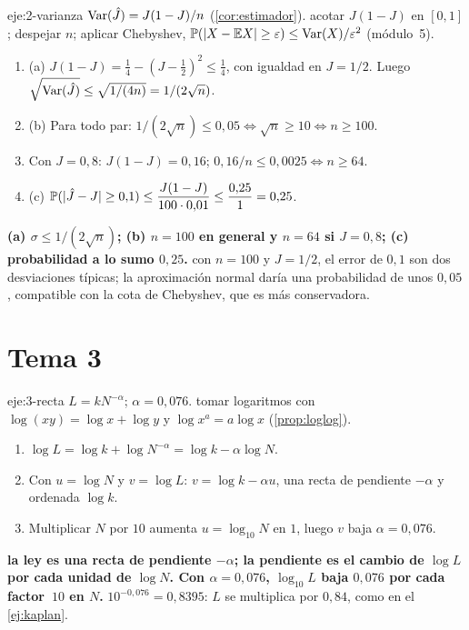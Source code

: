 \begin{solucion}{eje:2-varianza}
\datos $\operatorname{Var}(\hat J)=J(1-J)/n$ (\cref{cor:estimador}).
\planteamiento acotar $J(1-J)$ en $[0,1]$; despejar $n$; aplicar Chebyshev, $\mathbb{P}(\lvert X-\mathbb{E} X\rvert\ge\varepsilon)\le\operatorname{Var}(X)/\varepsilon^{2}$ (módulo~5).
\pasos
\begin{enumerate}[label=\arabic*.]
  \item (a) $J(1-J)=\tfrac14-(J-\tfrac12)^{2}\le\tfrac14$, con igualdad en $J=1/2$. Luego $\sqrt{\operatorname{Var}(\hat J)}\le\sqrt{1/(4n)}=1/(2\sqrt n)$.
  \item (b) Para todo par: $1/(2\sqrt n)\le 0{,}05\iff\sqrt n\ge 10\iff n\ge 100$.
  \item Con $J=0{,}8$: $J(1-J)=0{,}16$; $0{,}16/n\le 0{,}0025\iff n\ge 64$.
  \item (c) $\mathbb{P}(\lvert\hat J-J\rvert\ge 0{,}1)\le\dfrac{J(1-J)}{100\cdot 0{,}01}\le\dfrac{0{,}25}{1}=0{,}25$.
\end{enumerate}
\resultado \textbf{(a) $\sigma\le 1/(2\sqrt n)$; (b) $n=100$ en general y $n=64$ si $J=0{,}8$; (c) probabilidad a lo sumo $0{,}25$.}
\comprobacion con $n=100$ y $J=1/2$, el error de $0{,}1$ son dos desviaciones típicas; la aproximación normal daría una probabilidad de unos $0{,}05$, compatible con la cota de Chebyshev, que es más conservadora.
\end{solucion}

\section{Tema 3}

\begin{solucion}{eje:3-recta}
\datos $L=kN^{-\alpha}$; $\alpha=0{,}076$.
\planteamiento tomar logaritmos con $\log(xy)=\log x+\log y$ y $\log x^{a}=a\log x$ (\cref{prop:loglog}).
\pasos
\begin{enumerate}[label=\arabic*.]
  \item $\log L=\log k+\log N^{-\alpha}=\log k-\alpha\log N$.
  \item Con $u=\log N$ y $v=\log L$: $v=\log k-\alpha u$, una recta de pendiente $-\alpha$ y ordenada $\log k$.
  \item Multiplicar $N$ por $10$ aumenta $u=\log_{10}N$ en $1$, luego $v$ baja $\alpha=0{,}076$.
\end{enumerate}
\resultado \textbf{la ley es una recta de pendiente $-\alpha$; la pendiente es el cambio de $\log L$ por cada unidad de $\log N$. Con $\alpha=0{,}076$, $\log_{10}L$ baja $0{,}076$ por cada factor~$10$ en $N$.}
\comprobacion $10^{-0{,}076}=0{,}8395$: $L$ se multiplica por $0{,}84$, como en el \cref{ej:kaplan}.
\end{solucion}


